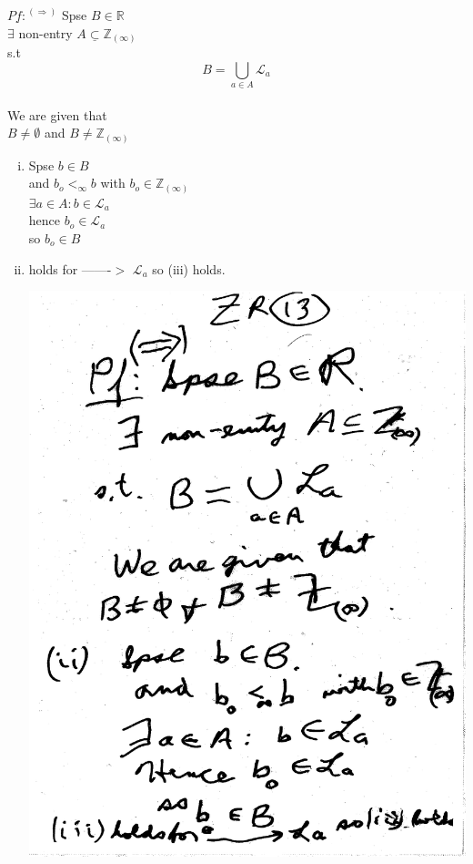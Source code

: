 \documentclass[10pt,a4paper]{article}
\begin{document}
$\underline{Pf:}^{(\Rightarrow)}$ Spse $B \in \mathbb{R}$
\\ $\exists$ non-entry $A \underline{\subset} \mathbb{Z}_{(\infty)}$
\\ s.t $$B=\bigcup_{a \in A} \mathcal{L}_a$$
\\ We are given that
\\ $B \neq \emptyset$ and $B \neq \mathbb{Z}_{(\infty)}$ 
\begin{enumerate}[(ii)] 
\item Spse $b \in B$
\\ and $b_o <_\infty b$ with $b_o \in \mathbb{Z}_{(\infty)}$
\\ $\exists a \in A: b \in \mathcal{L}_a$
\\hence $b_o \in \mathcal{L}_a$
\\ so $b_o \in B$
\item holds for -------$>$ $\mathcal{L}_a$ so (iii) holds. 

\includegraphics[scale=.5]{Pages/ZR_13}


\end{enumerate}
\end{document}
